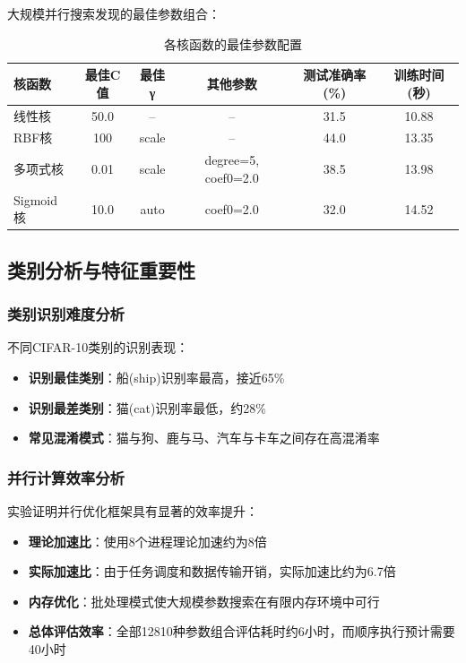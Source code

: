 \documentclass[UTF8]{report}
\theoremstyle{MyLineTheoremStyle} %
\theoremstyle{MyBlockTheoremStyle} %
\theoremstyle{MySubsubsectionStyle} %
\begin{document}
大规模并行搜索发现的最佳参数组合：

\begin{table}[h]
\centering
\caption{各核函数的最佳参数配置}
\begin{tabular}{l c c c c c}
\toprule
\textbf{核函数} & \textbf{最佳C值} & \textbf{最佳γ} & \textbf{其他参数} & \textbf{测试准确率(\%)} & \textbf{训练时间(秒)} \\
\midrule
线性核 & 50.0 & -- & -- & 31.5 & 10.88 \\
RBF核 & 100 & scale & -- & 44.0 & 13.35 \\
多项式核 & 0.01 & scale & degree=5, coef0=2.0 & 38.5 & 13.98 \\
Sigmoid核 & 10.0 & auto & coef0=2.0 & 32.0 & 14.52 \\
\bottomrule
\end{tabular}
\end{table}


\subsection{类别分析与特征重要性}

\subsubsection{类别识别难度分析}

不同CIFAR-10类别的识别表现：

\begin{itemize}
    \item \textbf{识别最佳类别}：船(ship)识别率最高，接近65\%
    \item \textbf{识别最差类别}：猫(cat)识别率最低，约28\%
    \item \textbf{常见混淆模式}：猫与狗、鹿与马、汽车与卡车之间存在高混淆率
\end{itemize}

\subsubsection{并行计算效率分析}

实验证明并行优化框架具有显著的效率提升：

\begin{itemize}
    \item \textbf{理论加速比}：使用8个进程理论加速约为8倍
    \item \textbf{实际加速比}：由于任务调度和数据传输开销，实际加速比约为6.7倍
    \item \textbf{内存优化}：批处理模式使大规模参数搜索在有限内存环境中可行
    \item \textbf{总体评估效率}：全部12810种参数组合评估耗时约6小时，而顺序执行预计需要40小时
\end{itemize}
\end{document}
